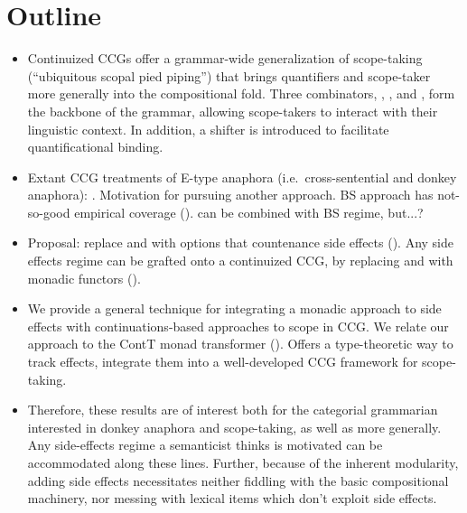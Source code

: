\section{Outline}
\begin{itemize}		
	\item Continuized CCGs offer a grammar-wide generalization of scope-taking (``ubiquitous scopal pied piping'') that brings quantifiers and scope-taker more generally into the compositional fold. Three combinators, , , and , form the backbone of the grammar, allowing scope-takers to interact with their linguistic context. In addition, a  shifter is introduced to facilitate quantificational binding. %
	
	\item Extant CCG treatments of E-type anaphora (i.e.~cross-sentential and donkey anaphora): \citealt{BarkerShan:2008}. Motivation for pursuing another approach. BS approach has not-so-good empirical coverage (\citealt{Charlow:2010}). \citealt{Groote:2006} can be combined with BS regime, but...?%
	
	\item Proposal: replace  and  with options that countenance side effects (\citealt{Shan:2005}). Any side effects regime can be grafted onto a continuized CCG, by replacing  and  with monadic functors (\citealt{Moggi:1989, Wadler:1992, Wadler:1994, Wadler:1995, Shan:2002}).%
	
	\item We provide a general technique for integrating a monadic approach to side effects with continuations-based approaches to scope in CCG. We relate our approach to the ContT monad transformer (\citealt{Liangetal}). Offers a type-theoretic way to track effects, integrate them into a well-developed CCG framework for scope-taking.%
	
	\item Therefore, these results are of interest both for the categorial grammarian interested in donkey anaphora and scope-taking, as well as more generally. Any side-effects regime a semanticist thinks is motivated can be accommodated along these lines. Further, because of the inherent modularity, adding side effects necessitates neither fiddling with the basic compositional machinery, nor messing with lexical items which don't exploit side effects.%
	

\end{itemize}
